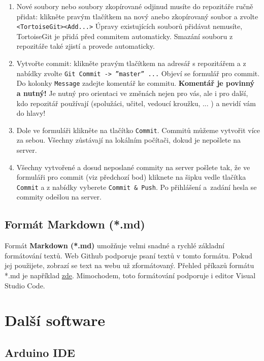 \begin{enumerate}
	\item Nové soubory nebo soubory zkopírované odjinud musíte do repozitáře ručně přidat: 
	klikněte pravým tlačítkem na nový anebo zkopírovaný soubor a zvolte {\tt <TortoiseGit><Add...>} 
	Úpravy existujících souborů přidávat nemusíte, TortoiseGit je přidá před commitem automaticky. 
	Smazání souboru z repozitáře také zjistí a provede automaticky.
	
	\item Vytvořte commit: klikněte pravým tlačítkem na adresář s repozitářem a z nabídky zvolte {\tt Git Commit -> ''master'' ...}
	Objeví se formulář pro commit. Do kolonky {\tt Message} zadejte komentář ke commitu. 
	{\bf Komentář je povinný a nutný!} 
	Je nutný pro orientaci ve změnách nejen pro vás, ale i pro další, kdo repozitář používají (spolužáci, učitel, vedoucí kroužku, ... )  a nevidí vám do hlavy!
	
	\item Dole ve formuláři klikněte na tlačítko {\tt Commit}. Commitů můžeme vytvořit více za sebou. Všechny zůstávají na lokálním počítači, dokud je nepošlete na server.
	
	\item Všechny vytvořené a dosud neposlané commity na server pošlete tak, že ve formuláři pro commit (viz předchozí bod) kliknete 
	na šipku vedle tlačítka {\tt Commit} a z nabídky vyberete {\tt Commit \& Push}. Po přihlášení a~zadání hesla se commity odešlou na server.	
\end{enumerate}

 
 \subsection{Formát Markdown (*.md) }  
 
Formát \textbf{Markdown (*.md) } umožňuje velmi snadné a rychlé základní formátování textů. 
Web Github podporuje psaní textů v tomto formátu. 
Pokud jej použijete, zobrazí se text na webu už zformátovaný. 
Přehled příkazů formátu *.md je například \href{https://guides.github.com/pdfs/markdown-cheatsheet-online.pdf}{zde}.
 Mimochodem, toto formátování podporuje i editor Visual Studio Code.
 
\section{Další software}


\subsection{Arduino IDE}  \label{arduino:ide}

